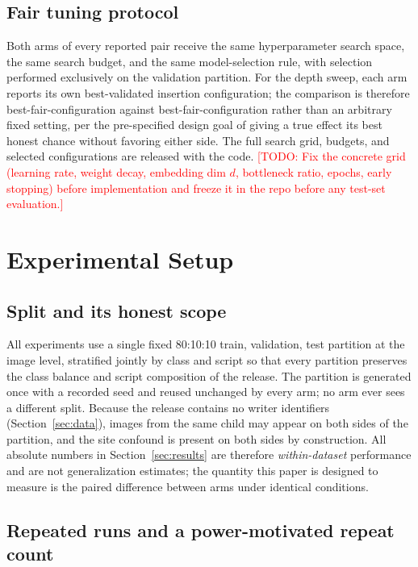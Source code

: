 \documentclass[11pt,a4paper]{article}
\newcommand{\todonote}[1]{\textcolor{red}{[TODO: #1]}}
\begin{document}
\subsection{Fair tuning protocol}

Both arms of every reported pair receive the same hyperparameter
search space, the same search budget, and the same model-selection
rule, with selection performed exclusively on the validation
partition. For the depth sweep, each arm reports its own
best-validated insertion configuration; the comparison is therefore
best-fair-configuration against best-fair-configuration rather than
an arbitrary fixed setting, per the pre-specified design goal of
giving a true effect its best honest chance without favoring either
side. The full search grid, budgets, and selected configurations are
released with the code. \todonote{Fix the concrete grid (learning
rate, weight decay, embedding dim $d$, bottleneck ratio, epochs,
early stopping) before implementation and freeze it in the repo
before any test-set evaluation.}

\section{Experimental Setup}
\label{sec:setup}

\subsection{Split and its honest scope}

All experiments use a single fixed 80:10:10 train, validation, test
partition at the image level, stratified jointly by class and script
so that every partition preserves the class balance and script
composition of the release. The partition is generated once with a
recorded seed and reused unchanged by every arm; no arm ever sees a
different split. Because the release contains no writer identifiers
(Section~\ref{sec:data}), images from the same child may appear on
both sides of the partition, and the site confound is present on both
sides by construction. All absolute numbers in
Section~\ref{sec:results} are therefore \emph{within-dataset}
performance and are not generalization estimates; the quantity this
paper is designed to measure is the paired difference between arms
under identical conditions.

\subsection{Repeated runs and a power-motivated repeat count}
\end{document}
